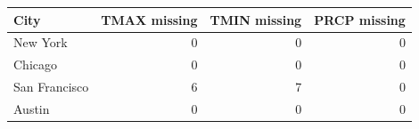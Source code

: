 \begin{tabular}{lrrr}
\toprule
City & TMAX missing & TMIN missing & PRCP missing \\
\midrule
New York & 0 & 0 & 0 \\
Chicago & 0 & 0 & 0 \\
San Francisco & 6 & 7 & 0 \\
Austin & 0 & 0 & 0 \\
\bottomrule
\end{tabular}

